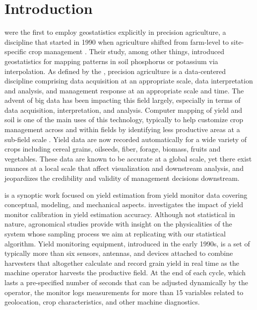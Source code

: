 \section{Introduction}

\cite{Miller1988} were the first to employ geostatistics explicitly in
precision agriculture, a discipline that started in 1990 when
agriculture shifted from farm-level to site-specific crop management
\citep{Oliver2010}. Their study, among other things, introduced
geostatistics for mapping patterns in soil phosphorus or potassium via
interpolation. As defined by the \citet{Council1997}, precision
agriculture is a data-centered discipline comprising data acquisition
at an appropriate scale, data interpretation and analysis, and
management response at an appropriate scale and time. The advent of
big data has been impacting this field largely, especially in terms of
data acquisition, interpretation, and analysis. Computer mapping of
yield and soil is one of the main uses of this technology, typically
to help customize crop management across and within fields by
identifying less productive areas at a sub-field scale
\citep{Lowenberg-DeBoer2019}. Yield data are now recorded
automatically for a wide variety of crops including cereal grains,
oilseeds, fiber, forage, biomass, fruits and vegetables. These data
are known to be accurate at a global scale, yet there exist nuances at
a local scale that affect visualization and downstream analysis, and
jeopardizes the credibility and validity of management decisions
downstream.

\cite{Ross2008} is a synoptic work focused on yield estimation from
yield monitor data covering conceptual, modeling, and mechanical
aspects. \cite{Arslan2002} investigates the impact of yield monitor
calibration in yield estimation accuracy. Although not statistical in
nature, agronomical studies provide with insight on the physicalities
of the system whose sampling process we aim at replicating with our
statistical algorithm. Yield monitoring equipment, introduced in the
early 1990s, is a set of typically more than six sensors, antennas,
and devices attached to combine harvesters that altogether calculate
and record grain yield in real time as the machine operator harvests
the productive field. At the end of each cycle, which lasts a
pre-specified number of seconds that can be adjusted dynamically by
the operator, the monitor logs measurements for more than 15 variables
related to geolocation, crop characteristics, and other machine
diagnostics.

